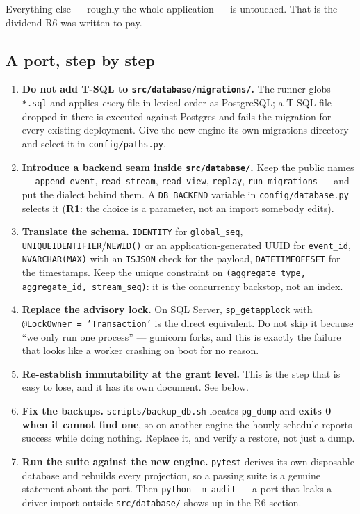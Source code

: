 \documentclass[11pt]{article}
\newcommand{\cfg}[1]{\texttt{#1}}
\newcommand{\rulename}[1]{\textbf{#1}}
\begin{document}
Everything else --- roughly the whole application --- is untouched. That is the dividend
R6 was written to pay.

\subsection{A port, step by step}

\begin{enumerate}
  \item \textbf{Do not add T-SQL to \texttt{src/database/migrations/}.} The runner globs
        \texttt{*.sql} and applies \emph{every} file in lexical order as PostgreSQL; a
        T-SQL file dropped in there is executed against Postgres and fails the migration for
        every existing deployment. Give the new engine its own migrations directory and
        select it in \texttt{config/paths.py}.
  \item \textbf{Introduce a backend seam inside \texttt{src/database/}.} Keep the public
        names --- \texttt{append\_event}, \texttt{read\_stream}, \texttt{read\_view},
        \texttt{replay}, \texttt{run\_migrations} --- and put the dialect behind them. A
        \cfg{DB\_BACKEND} variable in \texttt{config/database.py} selects it (\rulename{R1}:
        the choice is a parameter, not an import somebody edits).
  \item \textbf{Translate the schema.} \texttt{IDENTITY} for \texttt{global\_seq},
        \texttt{UNIQUEIDENTIFIER}/\texttt{NEWID()} or an application-generated UUID for
        \texttt{event\_id}, \texttt{NVARCHAR(MAX)} with an \texttt{ISJSON} check for the
        payload, \texttt{DATETIMEOFFSET} for the timestamps. Keep the unique constraint on
        \texttt{(aggregate\_type, aggregate\_id, stream\_seq)}: it is the concurrency
        backstop, not an index.
  \item \textbf{Replace the advisory lock.} On SQL Server, \texttt{sp\_getapplock} with
        \texttt{@LockOwner = 'Transaction'} is the direct equivalent. Do not skip it because
        ``we only run one process'' --- gunicorn forks, and this is exactly the failure that
        looks like a worker crashing on boot for no reason.
  \item \textbf{Re-establish immutability at the grant level.} This is the step that is
        easy to lose, and it has its own document. See below.
  \item \textbf{Fix the backups.} \texttt{scripts/backup\_db.sh} locates \texttt{pg\_dump}
        and \textbf{exits 0 when it cannot find one}, so on another engine the hourly
        schedule reports success while doing nothing. Replace it, and verify a restore, not
        just a dump.
  \item \textbf{Run the suite against the new engine.} \texttt{pytest} derives its own
        disposable database and rebuilds every projection, so a passing suite is a genuine
        statement about the port. Then \texttt{python -m audit} --- a port that leaks a
        driver import outside \texttt{src/database/} shows up in the R6 section.
\end{enumerate}
\end{document}
